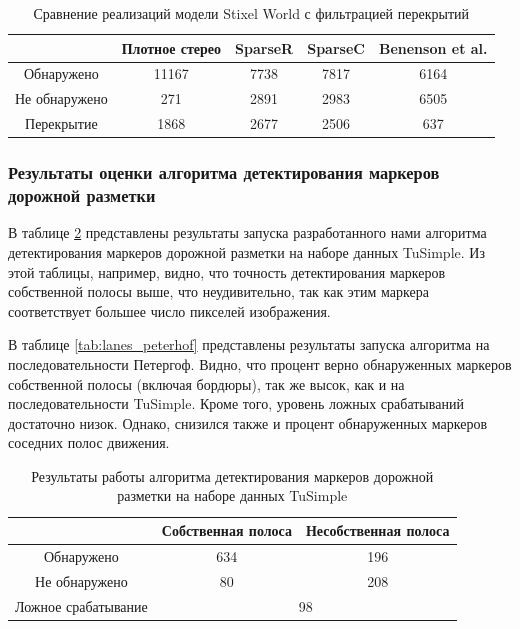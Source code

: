\documentclass[aps,%
14pt,%
final,%
oneside,
onecolumn,%
musixtex, %
superscriptaddress,%
centertags]{extarticle} %
\begin{document}
\begin{table}
\begin{tabular}{|c|c|c|c|c|}
\hline
						 & Плотное стерео & SparseR & SparseC & Benenson et al. \cite{doppia_repo} \\
\hline
	Обнаружено 			& 11167 & 7738 & 7817 & 6164\\
\hline
	Не обнаружено 		& 271   & 2891 & 2983 & 6505\\
\hline
	Перекрытие			& 1868  & 2677 & 2506 & 637\\
\hline
\end{tabular}
\caption{Сравнение реализаций модели Stixel World с фильтрацией перекрытий}
\label{tab:filter_occ}
\end{table}

\subsubsection{Результаты оценки алгоритма детектирования маркеров дорожной разметки}

В таблице \ref{tab:lanes_tusimple} представлены результаты запуска разработанного нами алгоритма детектирования маркеров дорожной разметки на наборе данных TuSimple. Из этой таблицы, например, видно, что точность детектирования маркеров собственной полосы выше, что неудивительно, так как этим маркера соответствует большее число пикселей изображения.

В таблице \ref{tab:lanes_peterhof} представлены результаты запуска алгоритма на последовательности Петергоф. Видно, что процент верно обнаруженных маркеров собственной полосы (включая бордюры), так же высок, как и на последовательности TuSimple. Кроме того, уровень ложных срабатываний достаточно низок. Однако, снизился также и процент обнаруженных маркеров соседних полос движения.

\begin{table}
\center
\begin{tabular}{|c|c|c|}
\hline
			& Собственная полоса & Несобственная полоса \\
\hline
	Обнаружено				& 634 & 196\\
\hline
	Не обнаружено			& 80  & 208\\
\hline
	Ложное срабатывание		& \multicolumn{2}{c|}{98}\\
\hline
\end{tabular}
\caption{Результаты работы алгоритма детектирования маркеров дорожной разметки на наборе данных TuSimple}
\label{tab:lanes_tusimple}
\end{table}
\end{document}
